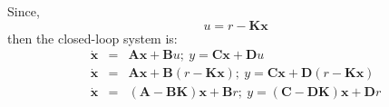 Since,
\[
u = r - \mathbf{Kx}
\]
then the closed-loop system is:
\begin{eqnarray*}
	\dot{\mathbf{x}} & = & \mathbf{A}\mathbf{x}+\mathbf{B}u;\ y = \mathbf{C}\mathbf{x}+\mathbf{D}u \\
	\dot{\mathbf{x}} & = & \mathbf{A}\mathbf{x}+\mathbf{B}(r - \mathbf{K}\mathbf{x});\ y = \mathbf{C}\mathbf{x}+\mathbf{D}(r - \mathbf{K}\mathbf{x}) \\
	\dot{\mathbf{x}} & = & (\mathbf{A}-\mathbf{B}\mathbf{K})\mathbf{x}+\mathbf{B}r;\ y = (\mathbf{C}-\mathbf{D}\mathbf{K})\mathbf{x}+\mathbf{D}r \\
\end{eqnarray*}

\endinput

